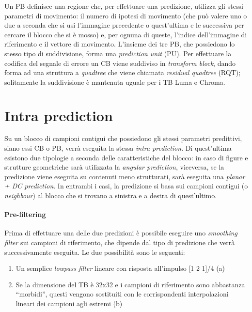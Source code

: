 Un PB definisce una regione che, per effettuare una predizione, utilizza gli 
stessi parametri di movimento: il numero di ipotesi di movimento (che può 
valere uno o due a seconda che si usi l'immagine precedente o quest'ultima 
e le successiva per cercare il blocco che si è mosso) e, per ognuna di queste, 
l'indice dell'immagine di riferimento e il vettore di movimento.
L'insieme dei tre PB, che possiedono lo stesso tipo di suddivisione, 
forma una \emph{prediction unit} (PU).
Per effettuare la codifica del segnale di errore un CB viene suddiviso in 
\emph{transform block}, dando forma ad una struttura a \emph{quadtree} che 
viene chiamata \emph{residual quadtree} (RQT); solitamente la suddivisione 
è mantenuta uguale per i TB Luma e Chroma.

\newpage 
\section{Intra prediction}
Su un blocco di campioni contigui che possiedono gli stessi parametri 
predittivi, siano essi CB o PB, verrà eseguita la stessa 
\emph{intra prediction}.
Di quest'ultima esistono due tipologie a seconda delle caratteristiche 
del blocco: in caso di figure e strutture geometriche sarà utilizzata 
la \emph{angular prediction}, viceversa, se la predizione viene eseguita 
su contenuti meno strutturati, sarà eseguita una \emph{planar + DC prediction}. 
In entrambi i casi, la predizione si basa sui campioni contigui (o 
\emph{neighbour}) al blocco che si trovano a sinistra e a destra di 
quest'ultimo.

\paragraph*{Pre-filtering}
Prima di effettuare una delle due predizioni è possibile eseguire uno 
\emph{smoothing filter} sui campioni di riferimento, che dipende dal tipo di 
predizione che verrà successivamente eseguita. Le due possibilità sono le 
seguenti:
\begin{enumerate}
\item Un semplice \emph{lowpass filter} lineare con risposta all'impulso 
[1 2 1]/4 (a)
\item Se la dimensione del TB è 32x32 e i campioni di riferimento sono 
abbastanza ``morbidi'', questi vengono sostituiti con le corrispondenti 
interpolazioni lineari dei campioni agli estremi (b)
\end{enumerate}

